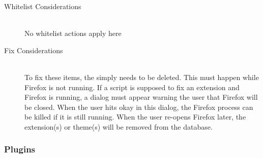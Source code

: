 \begin{description}
\item[Whitelist Considerations] \hfill \\
No whitelist actions apply here
\item[Fix Considerations] \hfill \\
To fix these items, the  simply needs to be deleted.  This must
happen while Firefox is not running.  If a script is supposed to fix an
extension and Firefox is running, a dialog must appear warning the user that
Firefox will be closed.  When the user hits okay in this dialog, the Firefox
process can be killed if it is still running.  When the user re-opens Firefox
later, the extension(s) or theme(s) will be removed from the database.
\end{description}

\subsubsection{Plugins}
